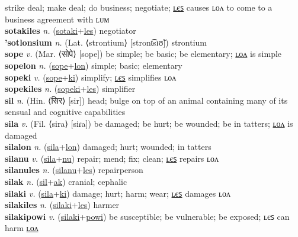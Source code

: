 strike deal; make deal; do business; negotiate; \hyperref[sotakiles]{ʟєꜱ} causes ʟᴏᴧ to come to a business agreement with ʟᴜᴍ \label{sotaki} \\
\textbf{sotakiles} \textit{n.} (\hyperref[sotaki]{sotaki}+\hyperref[les]{les})
negotiator \label{sotakiles} \\
\textbf{'sotlonsium} \textit{n.} (Lat. ⟨strontium⟩ [stront͡sɪʊ̃])
strontium \label{'sotlonsium} \\
\textbf{sope} \textit{v.} (Mar. ⟨सोपे⟩ [sope])
be simple; be basic; be elementary; \hyperref[sopelon]{ʟᴏᴧ} is simple \label{sope} \\
\textbf{sopelon} \textit{n.} (\hyperref[sope]{sope}+\hyperref[lon]{lon})
simple; basic; elementary \label{sopelon} \\
\textbf{sopeki} \textit{v.} (\hyperref[sope]{sope}+\hyperref[ki]{ki})
simplify; \hyperref[sopekiles]{ʟєꜱ} simplifies ʟᴏᴧ \label{sopeki} \\
\textbf{sopekiles} \textit{n.} (\hyperref[sopeki]{sopeki}+\hyperref[les]{les})
simplifier \label{sopekiles} \\
\textbf{sil} \textit{n.} (Hin. ⟨सिर⟩ [sir])
head; bulge on top of an animal containing many of its sensual and cognitive capabilities \label{sil} \\
\textbf{sila} \textit{v.} (Fil. ⟨sira⟩ [siɾa])
be damaged; be hurt; be wounded; be in tatters; \hyperref[silalon]{ʟᴏᴧ} is damaged \label{sila} \\
\textbf{silalon} \textit{n.} (\hyperref[sila]{sila}+\hyperref[lon]{lon})
damaged; hurt; wounded; in tatters \label{silalon} \\
\textbf{silanu} \textit{v.} (\hyperref[sila]{sila}+\hyperref[nu]{nu})
repair; mend; fix; clean; \hyperref[silanules]{ʟєꜱ} repairs ʟᴏᴧ \label{silanu} \\
\textbf{silanules} \textit{n.} (\hyperref[silanu]{silanu}+\hyperref[les]{les})
repairperson \label{silanules} \\
\textbf{silak} \textit{n.} (\hyperref[sil]{sil}+\hyperref[ak]{ak})
cranial; cephalic \label{silak} \\
\textbf{silaki} \textit{v.} (\hyperref[sila]{sila}+\hyperref[ki]{ki})
damage; hurt; harm; wear; \hyperref[silakiles]{ʟєꜱ} damages ʟᴏᴧ \label{silaki} \\
\textbf{silakiles} \textit{n.} (\hyperref[silaki]{silaki}+\hyperref[les]{les})
harmer \label{silakiles} \\
\textbf{silakipowi} \textit{v.} (\hyperref[silaki]{silaki}+\hyperref[powi]{powi})
be susceptible; be vulnerable; be exposed; ʟєꜱ can harm \hyperref[silakipowilon]{ʟᴏᴧ} \label{silakipowi} \\
